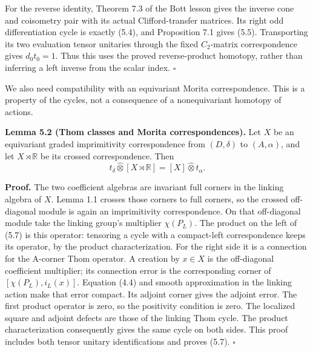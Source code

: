 \documentclass[
  11pt,
]{article}
\begin{document}
For the reverse identity, Theorem 7.3 of the Bott lesson gives the
inverse cone and coisometry pair with its actual Clifford-transfer
matrices. Its right odd differentiation cycle is exactly (5.4), and
Proposition 7.1 gives (5.5). Transporting its two evaluation tensor
unitaries through the fixed \(C_2\)-matrix correspondence gives
\(d_0t_0=1\). Thus this uses the proved reverse-product homotopy, rather
than inferring a left inverse from the scalar index. \(\square\)

We also need compatibility with an equivariant Morita correspondence.
This is a property of the cycles, not a consequence of a nonequivariant
homotopy of actions.

\textbf{Lemma 5.2 (Thom classes and Morita correspondences).} Let \(X\)
be an equivariant graded imprimitivity correspondence from
\((D,\delta)\) to \((A,\alpha)\), and let \(X\rtimes\mathbb R\) be its
crossed correspondence. Then \[
t_\delta\widehat\otimes[X\rtimes\mathbb R]
 =[X]\widehat\otimes t_\alpha.
\tag{5.7}
\]

\textbf{Proof.} The two coefficient algebras are invariant full corners
in the linking algebra of \(X\). Lemma 1.1 crosses those corners to full
corners, so the crossed off-diagonal module is again an imprimitivity
correspondence. On that off-diagonal module take the linking group's
multiplier \(\chi(P_L)\). The product on the left of (5.7) is this
operator: tensoring a cycle with a compact-left correspondence keeps its
operator, by the product characterization. For the right side it is a
connection for the A-corner Thom operator. A creation by \(x\in X\) is
the off-diagonal coefficient multiplier; its connection error is the
corresponding corner of \([\chi(P_L),i_L(x)]\). Equation (4.4) and
smooth approximation in the linking action make that error compact. Its
adjoint corner gives the adjoint error. The first product operator is
zero, so the positivity condition is zero. The localized square and
adjoint defects are those of the linking Thom cycle. The product
characterization consequently gives the same cycle on both sides. This
proof includes both tensor unitary identifications and proves (5.7).
\(\square\)
\end{document}
